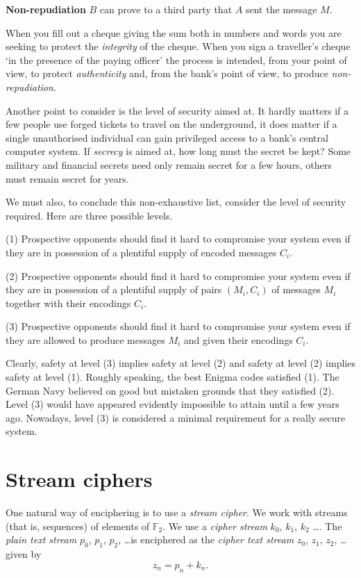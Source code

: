 \documentclass[12pt,a4paper]{article}
\theoremstyle{plain}
\theoremstyle{definition}
\begin{document}
    \noindent
    {\bf Non-repudiation} $B$ can prove to
    a third party that $A$
    sent the message $M$.

    When you fill out a cheque giving the sum both
    in numbers and words you are seeking to protect
    the \emph{integrity} of the cheque. When you
    sign a traveller's cheque `in the presence of
    the paying officer' the process is intended,
    from your point of view,
    to protect \emph{authenticity} and, from
    the bank's point of view, to produce
    \emph{non-repudiation}.

    Another point to consider is the level of
    security aimed at. It hardly matters if
    a few people use forged tickets to travel
    on the underground, it does matter
    if a single unauthorised individual can gain
    privileged access to a bank's central computer
    system. If \emph{secrecy} is aimed at, how long
    must the secret be kept? Some military
    and financial secrets need only remain secret
    for a few hours, others must remain secret
    for years.

    We must also, to conclude this non-exhaustive
    list, consider the level of security required.
    Here are three possible levels.

    (1) Prospective opponents should find
    it hard to compromise your system even
    if they are in possession of
    a plentiful supply of encoded messages $C_{i}$.

    (2) Prospective opponents should find
    it hard to compromise your system even
    if they are in possession of
    a plentiful supply of pairs $(M_{i},C_{i})$
    of messages $M_{i}$ together with their encodings $C_{i}$.

    (3) Prospective opponents should find
    it hard to compromise your system even
    if they are allowed to produce messages $M_{i}$
    and given their encodings $C_{i}$.

    \noindent Clearly, safety
    at level (3) implies safety at level (2)
    and safety at level (2) implies safety
    at level (1). Roughly speaking, the best Enigma codes
    satisfied (1). The German Navy believed on good
    but mistaken grounds that they satisfied (2).
    Level (3) would have appeared evidently impossible
    to attain until a few years ago.
    Nowadays, level (3) is considered
    a minimal requirement for a really secure system.

    \section{Stream ciphers} One natural way of
    enciphering is to use a \emph{stream cipher}.
    We work with streams (that is, sequences) of
    elements of ${\mathbb F}_{2}$.
    We use a \emph{cipher stream} $k_{0}$, $k_{1}$,
    $k_{2}$ \dots. The \emph{plain text stream}
    $p_{0}$, $p_{1}$, $p_{2}$, \dots is enciphered
    as the \emph{cipher text stream}
    $z_{0}$, $z_{1}$, $z_{2}$, \dots  given by
    \[z_{n}=p_{n}+k_{n}.\]
\end{document}
